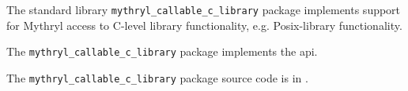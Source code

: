
The standard library {\tt mythryl\_callable\_c\_library} package implements support for Mythryl access to C-level library functionality, e.g. Posix-library functionality.

The {\tt mythryl\_callable\_c\_library} package implements the  api.

The {\tt mythryl\_callable\_c\_library} package source code is in .



